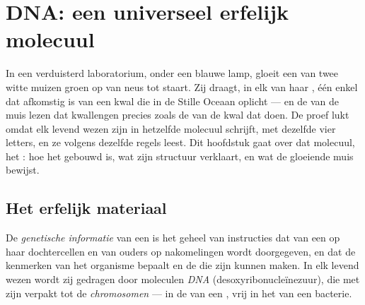 \chapter{DNA: een universeel erfelijk molecuul}\label{ch:g10:universal-dna}

In een verduisterd laboratorium, onder een blauwe lamp, gloeit een van
twee witte muizen groen op van neus tot staart. Zij draagt, in elk van
haar , één enkel  dat afkomstig is van een kwal die in de
Stille Oceaan oplicht --- en de  van de muis lezen dat kwallengen
precies zoals de  van de kwal dat doen. De proef lukt omdat elk
levend wezen zijn  in hetzelfde molecuul schrijft, met dezelfde
vier letters, en ze volgens dezelfde regels leest. Dit hoofdstuk gaat
over dat molecuul, het : hoe het gebouwd is, wat zijn structuur
verklaart, en wat de gloeiende muis bewijst.

\section{Het erfelijk materiaal}

\begin{definition}\label{def:g10:universal-dna:information}
De \emph{genetische informatie} van een 
is het geheel van instructies dat van een  op haar dochtercellen en
van ouders op nakomelingen wordt doorgegeven, en dat de kenmerken van
het organisme bepaalt en de  die zijn  kunnen maken. In
elk levend wezen wordt zij gedragen door moleculen
\emph{DNA} (desoxyribonucleïnezuur), die met  zijn
verpakt tot de \emph{chromosomen} --- in de 
van een , vrij in het  van een bacterie.
\end{definition}

